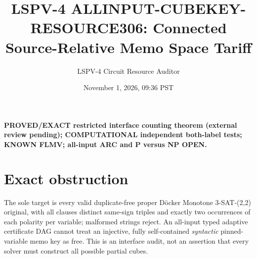 \documentclass[10pt]{article}
\title{LSPV-4 ALLINPUT-CUBEKEY-RESOURCE306: Connected Source-Relative Memo Space Tariff}
\author{LSPV-4 Circuit Resource Auditor}\date{November 1, 2026, 09:36 PST}
\begin{document}
\maketitle
\noindent\textbf{PROVED/EXACT restricted interface counting theorem (external review pending); COMPUTATIONAL independent both-label tests; KNOWN FLMV; all-input ARC and P versus NP OPEN.}
\section{Exact obstruction}
The sole target is every valid duplicate-free proper D\"ocker Monotone 3-SAT-(2,2) original, with all clauses distinct same-sign triples and exactly two occurrences of each polarity per variable; malformed strings reject. An all-input typed adaptive certificate DAG cannot treat an injective, fully self-contained \emph{syntactic} pinned-variable memo key as free. This is an interface audit, not an assertion that every solver must construct all possible partial cubes.
\end{document}
